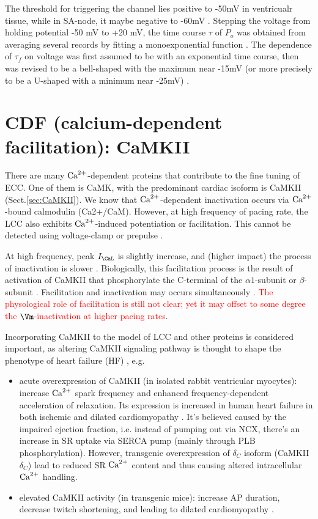 The threshold for triggering the channel lies positive to -50mV in ventricualr
tissue, while in SA-node, it maybe negative to -60mV \citep{noma1980}.
Stepping the voltage from holding potential -50 mV to +20 mV, the time course
$\tau$ of $P_o$ was obtained from averaging several records by fitting a
monoexponential function \citep{yue1990csi}. The dependence of $\tau_f$ on
voltage was first assumed to be with an exponential time course, then was
revised to be a bell-shaped with the maximum near -15mV (or more precisely to be
a U-shaped with a minimum near -25mV) \citep{mcdonald1982}.

\section{CDF (calcium-dependent facilitation): CaMKII }
\label{sec:facilitation_CaMKII}

There are many ${\text{Ca}^{2+}}$-dependent proteins that contribute to the fine tuning of
ECC. One of them is CaMK, with the predominant cardiac isoform is CaMKII
(Sect.\ref{sec:CaMKII}).
We know that ${\text{Ca}^{2+}}$-dependent inactivation occurs via ${\text{Ca}^{2+}}$-bound calmodulin
(Ca2+/CaM). However, at high frequency of pacing rate, the LCC also exhibits
${\text{Ca}^{2+}}$-induced potentiation or facilitation. This cannot be detected using
voltage-clamp or prepulse \citep{brette2006cc}. 

At high frequency, peak $I_\CaL$ is slightly increase, and (higher impact) the
process of inactivation is slower \citep{carmeliet2004}. Biologically, this
facilitation process is the result of activation of CaMKII that
phosphorylate the C-terminal of the $\alpha 1$-subunit
\citep{yuan1994, wu2001} or $\beta$-subunit \citep{Grueter2006}.
Facilitation and inactivation may occurs simultaneously \citep{hirano1994}.
\textcolor{red}{The physological role of facilitation is still not clear; yet
it may offset to some degree the $\Vm$-inactivation at higher pacing rates}.

Incorporating CaMKII to the model of LCC and other proteins is considered
important, as altering CaMKII signaling pathway is thought to shape the
phenotype of heart failure (HF) \citep{}, e.g. 
\begin{itemize}
  \item acute overexpression of CaMKII (in isolated rabbit ventricular
  myocytes): increase ${\text{Ca}^{2+}}$ spark frequency and enhanced frequency-dependent acceleration
  of relaxation. Its expression is increased in human heart failure in both
  ischemic and dilated cardiomyopathy \citep{hoch1999, kirchhefer1999}. It's
  believed caused by the impaired ejection fraction, i.e. instead of pumping
  out via NCX, there's an increase in SR uptake via SERCA pump (mainly through
  PLB phosphorylation). However, transgenic overexpression of $\delta_C$ isoform
  (CaMKII$\delta_C$) lead to reduced SR ${\text{Ca}^{2+}}$ content and thus causing altered
  intracellular ${\text{Ca}^{2+}}$ handling.

  \item elevated CaMKII activity (in transgenic mice): increase AP duration,
  decrease twitch shortening, and leading to dilated cardiomyopathy \citep{}.
\end{itemize} 

